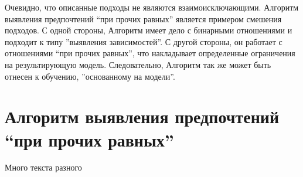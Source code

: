 		Очевидно, что описанные подходы не являются взаимоисключающими. Алгоритм выявления предпочтений \enquote{при прочих равных} является примером смешения подходов. С одной стороны, Алгоритм имеет дело с бинарными отношениями и подходит к типу ''выявления зависимостей''. С другой стороны, он работает с отношениями \enquote{при прочих равных}, что накладывает определенные ограничения на результирующую модель. Следовательно, Алгоритм так же может быть отнесен к обучению, ''основанному на модели''.
	
	
\section{Алгоритм выявления предпочтений \\ \enquote{при прочих равных}}

	Много текста разного